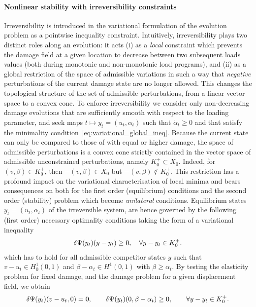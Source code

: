 % 

\paragraph{Nonlinear stability with irreversibility constraints}

Irreversibility is introduced in the variational formulation of the evolution problem as a pointwise inequality constraint. Intuitively, irreversibility plays two distinct roles along an evolution: it acts (i) as a \emph{local} constraint which prevents the damage field at a given location to decrease between two subsequent loads values (both during monotonic and non-monotonic load programs), and (ii) as a global restriction of the space of admissible variations in such a way that \emph{negative} perturbations of the current damage state are no longer allowed. This changes the topological structure of the set of admissible perturbations, from a linear vector space to a convex cone. 
To enforce irreversibility we consider only non-decreasing damage evolutions that are sufficiently smooth with respect to the loading parameter, and seek maps $t\mapsto y_t = (u_t, \alpha_t)$ such that $\dot \alpha_t \geq 0$ and that satisfy the minimality condition~\eqref{eq:variational_global_ineq}.
Because the current state can only be compared to those of with equal or higher damage, the space of admissible perturbations is a  convex cone strictly contained in the vector space of admissible unconstrained perturbations, namely $K^+_0\subset X_0$. Indeed, for $(v, \beta)\in K^+_0$, then $-(v, \beta) \in X_0$ but $-(v, \beta)\notin K^+_0$. This restriction has a profound impact on the variational characterisation of local minima and bears consequences on both for the first order (equilibrium) conditions and the second order (stability) problem which become \emph{unilateral} conditions.
Equilibrium states $y_t=(u_t, \alpha_t)$ of the irreversible system, are hence governed by the following (first order) necessary optimality conditions taking the form of a variational inequality
\begin{equation}
    \label{eq:eq_variational_inequality_full}
    \delta \Psi(y_t)(y-y_t) \geq 0, \quad \forall y-y_t \in K^+_0.
\end{equation}
% 
which has to hold for all admissible competitor states $y$ such that $v-u_t \in H^1_0(0, 1)$ and $\beta-\alpha_t\in H^1(0,1)$ with $\beta \geq \alpha_t$.
By testing the elasticity problem for fixed damage, and the damage problem for a given displacement field, we obtain 
\begin{equation}
    \label{eq:variational_equilibrium} 
    \delta \Psi(y_t)(v-u_t, 0) = 0, \qquad \delta \Psi(y_t)(0, \beta-\alpha_t) \geq 0, \qquad \forall y-y_t \in K^+_{0}.
\end{equation}

